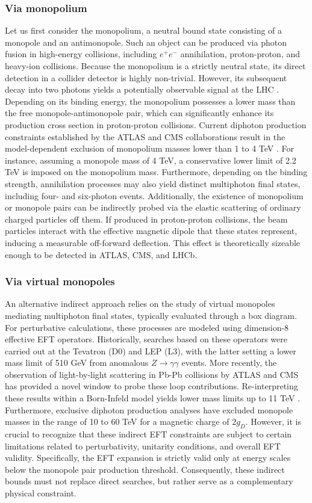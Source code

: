 \documentclass[a4paper,11pt]{article}
\begin{document}
\subsubsection{Via monopolium}
Let us first consider the monopolium, a neutral bound state consisting of a monopole and an antimonopole. Such an object can be produced via photon fusion in high-energy collisions, including $e^+e^-$ annihilation, proton-proton, and heavy-ion collisions. Because the monopolium is a strictly neutral state, its direct detection in a collider detector is highly non-trivial. However, its subsequent decay into two photons yields a potentially observable signal at the LHC \cite{Epele2012}.  Depending on its binding energy, the monopolium possesses a lower mass than the free monopole-antimonopole pair, which can significantly enhance its production cross section in proton-proton collisions. Current diphoton production constraints established by the ATLAS and CMS collaborations result in the model-dependent exclusion of monopolium masses lower than 1 to 4 TeV \cite{mitsou2026magneticmonopolesdirac}. For instance, assuming a monopole mass of 4 TeV, a conservative lower limit of 2.2 TeV is imposed on the monopolium mass. Furthermore, depending on the binding strength, annihilation processes may also yield distinct multiphoton final states, including four- and six-photon events.  Additionally, the existence of monopolium or monopole pairs can be indirectly probed via the elastic scattering of ordinary charged particles off them. If produced in proton-proton collisions, the beam particles interact with the effective magnetic dipole that these states represent, inducing a measurable off-forward deflection. This effect is theoretically sizeable enough to be detected in ATLAS, CMS, and LHCb. 
 \subsubsection{Via virtual monopoles}
 An alternative indirect approach relies on the study of virtual monopoles mediating multiphoton final states, typically evaluated through a box diagram. For perturbative calculations, these processes are modeled using dimension-8 effective EFT operators.  Historically, searches based on these operators were carried out at the Tevatron (D0) and LEP (L3), with the latter setting a lower mass limit of 510 GeV from anomalous $Z \rightarrow \gamma\gamma$ events. More recently, the observation of light-by-light scattering in Pb-Pb collisions by ATLAS and CMS has provided a novel window to probe these loop contributions. Re-interpreting these results within a Born-Infeld model yields lower mass limits up to 11 TeV \cite{Ellis2017}. Furthermore, exclusive diphoton production analyses have excluded monopole masses in the range of 10 to 60 TeV for a magnetic charge of $2g_D$.  However, it is crucial to recognize that these indirect EFT constraints are subject to certain limitations related to perturbativity, unitarity conditions, and overall EFT validity. Specifically, the EFT expansion is strictly valid only at energy scales below the monopole pair production threshold. Consequently, these indirect bounds must not replace direct searches, but rather serve as a complementary physical constraint.  
\end{document}
